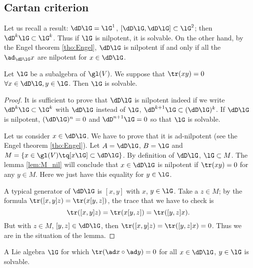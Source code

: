
\subsection{Cartan criterion}

Let us recall a result: $\dD\lG=\lG^1$, $[\dD\lG,\dD\lG]\subset\lG^2$; then $\dD^k\lG\subset\lG^k$. Thus if $\lG$ is nilpotent, it is solvable. On the other hand, by the Engel theorem \ref{tho:Engel}, $\dD\lG$ is nilpotent if and only if all the $\ad_{\dD\lG}x$ are nilpotent for $x\in\dD\lG$.


\begin{theorem}
Let $\lG$ be a subalgebra of $\gl(V)$. We suppose that $\tr(xy)=0$ $\forall x\in\dD\lG, y\in\lG$. Then $\lG$ is solvable.
\end{theorem}

\begin{proof}
It is sufficient to prove that $\dD\lG$ is nilpotent indeed if we write $\dD^k\lG\subset\lG^k$ with $\dD\lG$ instead of $\lG$, $\dD^{k+1}\lG\subset(\dD\lG)^k$. If $\dD\lG$ is nilpotent, $(\dD\lG)^n=0$ and $\dD^{n+1}\lG=0$ so that $\lG$ is solvable. 

Let us consider $x\in\dD\lG$. We have to prove that it is ad-nilpotent (see the Engel theorem \ref{tho:Engel}). Let $A=\dD\lG$, $B=\lG$ and $M=\{x\in\gl(V)\tq [x\lG]\subset\dD\lG\}$. By definition of $\dD\lG$, $\lG\subset M$. The lemma \ref{lem:M_nil} will conclude that $x\in\dD\lG$ is nilpotent if $\tr(xy)=0$ for any $y\in M$. Here we just have this equality for $y\in\lG$. 

A typical generator of $\dD\lG$ is $[x,y]$ with $x$, $y\in\lG$. Take a $z\in M$; by the formula $\tr([x,y]z)=\tr(x[y,z])$, the trace that we have to check is
\begin{equation}
  \tr([x,y]z)=\tr(x[y,z])
             =\tr([y,z]x).
\end{equation}
But with $z\in M$, $[y,z]\in\dD\lG$, then $\tr([x,y]z)=\tr([y,z]x)=0$. Thus we are in the situation of the lemma.
\end{proof}


\begin{corollary}\label{cor:ad_g_sol}
A Lie algebra $\lG$ for which $\tr(\ad x\circ\ad y)=0$ for all $x\in\dD\lG$, $y\in\lG$ is solvable.
\end{corollary}

